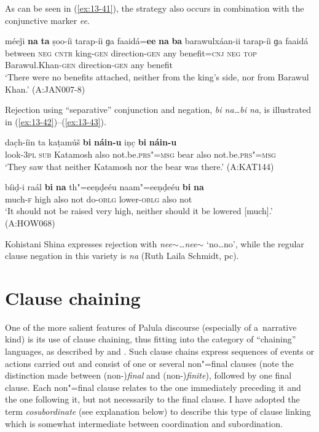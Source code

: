 As can be seen in (\ref{ex:13-41}), the strategy also occurs in combination with the conjunctive marker \textit{ee}.

\begin{exe}
\ex
\label{ex:13-41}
\gll méeǰi {\ob}\textbf{na} \textbf{ta} ṣoo-íi tarap-íi ɡa faaidá=\textbf{ee} \textbf{na} \textbf{ba} barawulxáan-ii tarap-íi ɡa faaidá{\cb}\\
between \textsc{neg} \textsc{cntr} king-\textsc{gen} direction-\textsc{gen} any benefit=\textsc{cnj} \textsc{neg} \textsc{top} Barawul.Khan-\textsc{gen} direction-\textsc{gen} any benefit  \\
\glt `There were no benefits attached, neither from the king's side, nor from Barawul Khan.' (A:JAN007-8) 
\end{exe}

Rejection using ``separative'' conjunction and negation, \textit{bi na{\ldots}bi na}, is illustrated in (\ref{ex:13-42})--(\ref{ex:13-43}).

\begin{exe}
\ex
\label{ex:13-42}
\gll dac̣h-íin ta {\ob}kaṭamúš \textbf{bi} \textbf{náin-u} iṇc̣ \textbf{bi} \textbf{náin-u}{\cb}\\
look-\textsc{3pl} \textsc{sub} Katamosh also not.be.\textsc{prs"=msg} bear also not.be.\textsc{prs"=msg} \\
\glt `They saw that neither Katamosh nor the bear was there.' (A:KAT144)

\ex
\label{ex:13-43}
\gll bíiḍ-i raál \textbf{bi} \textbf{na} th"=eeṇḍeéu naam"=eeṇḍeéu \textbf{bi} \textbf{na} \\
much-\textsc{f} high also not do-\textsc{oblg} lower-\textsc{oblg} also not  \\
\glt `It should not be raised very high, neither should it be lowered [much].' (A:HOW068) 
\end{exe}

Kohistani Shina expresses rejection with \textit{nee$\sim${\ldots}nee$\sim$} `no{\ldots}no', while the regular clause negation in this variety is \textit{na} (Ruth Laila Schmidt, pc).


\section{Clause chaining}
\label{sec:13-3}

One of the more salient features of Palula discourse (especially of a~narrative kind) is its use of clause chaining, thus fitting into the category of ``chaining'' languages, as described by \citet[242]{thompsonetal2007} and \citet[374--376]{longacre2007}. Such clause chains express sequences of events or actions carried out and consist of one or several non"=final clauses (note the distinction made between (non-)\textit{final} and (non-)\textit{finite}), followed by one final clause. Each non"=final clause relates to the one immediately preceding it and the one following it, but not necessarily to the final clause. I have adopted the term \textit{cosubordinate} (see explanation below) to describe this type of clause linking which is somewhat intermediate between coordination and subordination.


